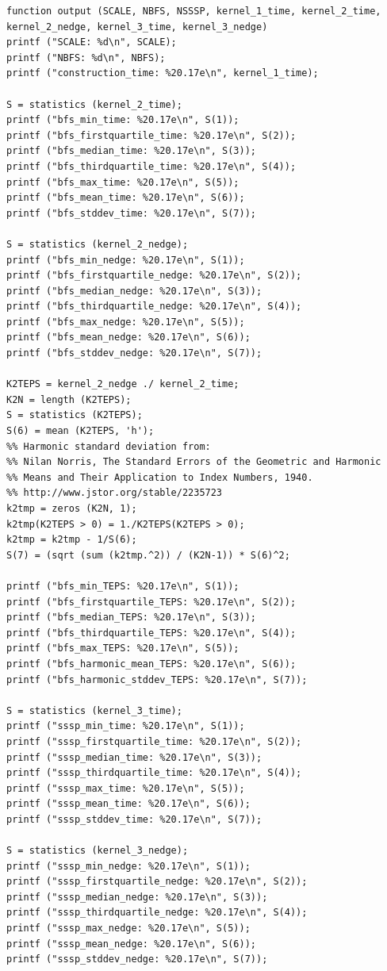 \documentclass{article}
\begin{document}
\begin{lstlisting}
function output (SCALE, NBFS, NSSSP, kernel_1_time, kernel_2_time, kernel_2_nedge, kernel_3_time, kernel_3_nedge)
printf ("SCALE: %d\n", SCALE);
printf ("NBFS: %d\n", NBFS);
printf ("construction_time: %20.17e\n", kernel_1_time);

S = statistics (kernel_2_time);
printf ("bfs_min_time: %20.17e\n", S(1));
printf ("bfs_firstquartile_time: %20.17e\n", S(2));
printf ("bfs_median_time: %20.17e\n", S(3));
printf ("bfs_thirdquartile_time: %20.17e\n", S(4));
printf ("bfs_max_time: %20.17e\n", S(5));
printf ("bfs_mean_time: %20.17e\n", S(6));
printf ("bfs_stddev_time: %20.17e\n", S(7));

S = statistics (kernel_2_nedge);
printf ("bfs_min_nedge: %20.17e\n", S(1));
printf ("bfs_firstquartile_nedge: %20.17e\n", S(2));
printf ("bfs_median_nedge: %20.17e\n", S(3));
printf ("bfs_thirdquartile_nedge: %20.17e\n", S(4));
printf ("bfs_max_nedge: %20.17e\n", S(5));
printf ("bfs_mean_nedge: %20.17e\n", S(6));
printf ("bfs_stddev_nedge: %20.17e\n", S(7));

K2TEPS = kernel_2_nedge ./ kernel_2_time;
K2N = length (K2TEPS);
S = statistics (K2TEPS);
S(6) = mean (K2TEPS, 'h');
%% Harmonic standard deviation from:
%% Nilan Norris, The Standard Errors of the Geometric and Harmonic
%% Means and Their Application to Index Numbers, 1940.
%% http://www.jstor.org/stable/2235723
k2tmp = zeros (K2N, 1);
k2tmp(K2TEPS > 0) = 1./K2TEPS(K2TEPS > 0);
k2tmp = k2tmp - 1/S(6);
S(7) = (sqrt (sum (k2tmp.^2)) / (K2N-1)) * S(6)^2;

printf ("bfs_min_TEPS: %20.17e\n", S(1));
printf ("bfs_firstquartile_TEPS: %20.17e\n", S(2));
printf ("bfs_median_TEPS: %20.17e\n", S(3));
printf ("bfs_thirdquartile_TEPS: %20.17e\n", S(4));
printf ("bfs_max_TEPS: %20.17e\n", S(5));
printf ("bfs_harmonic_mean_TEPS: %20.17e\n", S(6));
printf ("bfs_harmonic_stddev_TEPS: %20.17e\n", S(7));

S = statistics (kernel_3_time);
printf ("sssp_min_time: %20.17e\n", S(1));
printf ("sssp_firstquartile_time: %20.17e\n", S(2));
printf ("sssp_median_time: %20.17e\n", S(3));
printf ("sssp_thirdquartile_time: %20.17e\n", S(4));
printf ("sssp_max_time: %20.17e\n", S(5));
printf ("sssp_mean_time: %20.17e\n", S(6));
printf ("sssp_stddev_time: %20.17e\n", S(7));

S = statistics (kernel_3_nedge);
printf ("sssp_min_nedge: %20.17e\n", S(1));
printf ("sssp_firstquartile_nedge: %20.17e\n", S(2));
printf ("sssp_median_nedge: %20.17e\n", S(3));
printf ("sssp_thirdquartile_nedge: %20.17e\n", S(4));
printf ("sssp_max_nedge: %20.17e\n", S(5));
printf ("sssp_mean_nedge: %20.17e\n", S(6));
printf ("sssp_stddev_nedge: %20.17e\n", S(7));


\end{lstlisting}
\end{document}
